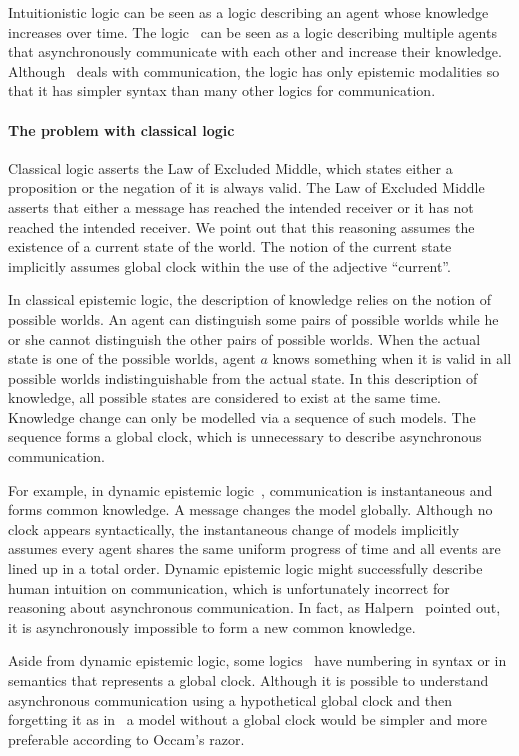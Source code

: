 Intuitionistic logic can be seen as a logic describing an agent whose knowledge increases over
time.
The logic \iec\,  can be seen as a logic describing multiple agents
that asynchronously communicate with each other and increase their knowledge.
Although \iec\, deals with communication, the logic has only epistemic modalities so that it
has simpler syntax than many other logics for communication.

\paragraph{The problem with classical logic}
Classical logic asserts the Law of Excluded Middle, which states
either a proposition or the negation of it is always valid.
The Law of Excluded Middle asserts that either 
a message has reached the intended receiver or it has not reached the intended receiver.
We point out that this reasoning assumes the existence of a current state of the world.
The notion of the current state implicitly assumes global clock within the use of the
adjective ``current''.
 
In classical epistemic logic, the description of knowledge relies on the notion of possible
worlds.
An agent can distinguish some pairs of possible worlds while
he or she cannot distinguish the other pairs of possible worlds.
When the actual state is one of the possible worlds,
agent $a$ knows something when it is valid in all possible worlds
indistinguishable from the actual state.
In this description of knowledge,
all possible states are considered to exist at the same time.
Knowledge change can only be modelled via a sequence of such models.
The sequence forms a global clock, which is unnecessary to describe asynchronous
communication.

For example, in dynamic epistemic logic~\cite{ditmarsch2007dynamic,van2003concurrent},
communication is instantaneous and forms common knowledge.
A message changes the model globally.
Although no clock appears syntactically,
the instantaneous change of models implicitly assumes
every agent shares the same uniform progress of time and
all events are lined up in a total order.
Dynamic epistemic logic might successfully describe human intuition on communication,
which is unfortunately incorrect for reasoning about asynchronous communication.
In fact, as Halpern~\cite{halpern1990knowledge} pointed out,
it is asynchronously impossible to form a new common knowledge.

Aside from dynamic epistemic logic, 
some logics~\cite{sato13study}
have numbering in syntax or in semantics that represents a global clock.
Although it is possible to understand asynchronous communication using a hypothetical
global clock and then forgetting it as in~\cite{halpern1990knowledge}
a model without a global clock would be simpler and more preferable according to
Occam's razor.

